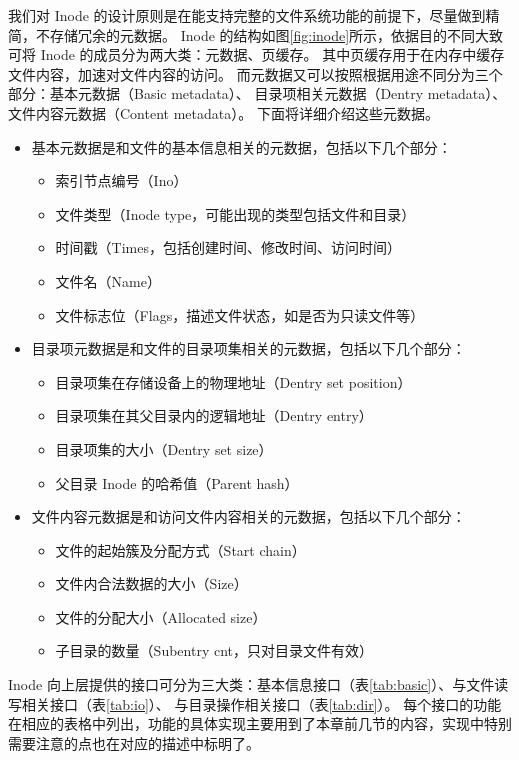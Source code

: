 我们对 Inode 的设计原则是在能支持完整的文件系统功能的前提下，尽量做到精简，不存储冗余的元数据。
Inode 的结构如图\ref{fig:inode}所示，依据目的不同大致可将 Inode 的成员分为两大类：元数据、页缓存。
其中页缓存用于在内存中缓存文件内容，加速对文件内容的访问。
而元数据又可以按照根据用途不同分为三个部分：基本元数据（Basic metadata）、
目录项相关元数据（Dentry metadata）、文件内容元数据（Content metadata）。
下面将详细介绍这些元数据。
\begin{itemize}
    \item 基本元数据是和文件的基本信息相关的元数据，包括以下几个部分：
    \begin{itemize} 
        \item 索引节点编号（Ino）
        \item 文件类型（Inode type，可能出现的类型包括文件和目录）
        \item 时间戳（Times，包括创建时间、修改时间、访问时间）
        \item 文件名（Name）
        \item 文件标志位（Flags，描述文件状态，如是否为只读文件等）
    \end{itemize}
    \item 目录项元数据是和文件的目录项集相关的元数据，包括以下几个部分：
    \begin{itemize} 
        \item 目录项集在存储设备上的物理地址（Dentry set position）
        \item 目录项集在其父目录内的逻辑地址（Dentry entry）
        \item 目录项集的大小（Dentry set size）
        \item 父目录 Inode 的哈希值（Parent hash）
    \end{itemize}
    \item 文件内容元数据是和访问文件内容相关的元数据，包括以下几个部分：
    \begin{itemize} 
        \item 文件的起始簇及分配方式（Start chain）
        \item 文件内合法数据的大小（Size）
        \item 文件的分配大小（Allocated size）
        \item 子目录的数量（Subentry cnt，只对目录文件有效）
    \end{itemize}
\end{itemize}

Inode 向上层提供的接口可分为三大类：基本信息接口（表\ref{tab:basic}）、与文件读写相关接口（表\ref{tab:io}）、
与目录操作相关接口（表\ref{tab:dir}）。
每个接口的功能在相应的表格中列出，功能的具体实现主要用到了本章前几节的内容，实现中特别需要注意的点也在对应的描述中标明了。


